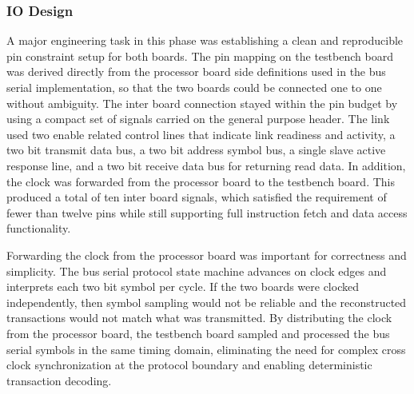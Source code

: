 \documentclass[12pt]{article}
\begin{document}
\subsubsection{IO Design}

A major engineering task in this phase was establishing a clean and reproducible pin constraint setup for both boards. The pin mapping on the testbench board was derived directly from the processor board side definitions used in the bus serial implementation, so that the two boards could be connected one to one without ambiguity. The inter board connection stayed within the pin budget by using a compact set of signals carried on the general purpose header. The link used two enable related control lines that indicate link readiness and activity, a two bit transmit data bus, a two bit address symbol bus, a single slave active response line, and a two bit receive data bus for returning read data. In addition, the clock was forwarded from the processor board to the testbench board. This produced a total of ten inter board signals, which satisfied the requirement of fewer than twelve pins while still supporting full instruction fetch and data access functionality.

Forwarding the clock from the processor board was important for correctness and simplicity. The bus serial protocol state machine advances on clock edges and interprets each two bit symbol per cycle. If the two boards were clocked independently, then symbol sampling would not be reliable and the reconstructed transactions would not match what was transmitted. By distributing the clock from the processor board, the testbench board sampled and processed the bus serial symbols in the same timing domain, eliminating the need for complex cross clock synchronization at the protocol boundary and enabling deterministic transaction decoding.
\end{document}
